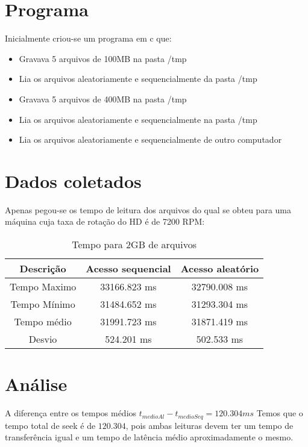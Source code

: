\documentclass[12pt,a4paper]{article}
\begin{document}
\section{Programa}
Inicialmente criou-se um programa em c que:
\begin{itemize}
\item Gravava 5 arquivos de 100MB na pasta /tmp
\item Lia os arquivos aleatoriamente e sequencialmente da pasta /tmp

\item Gravava 5 arquivos de 400MB na pasta /tmp
\item Lia os arquivos aleatoriamente e sequencialmente na pasta /tmp

\item Lia os arquivos aleatoriamente e sequencialmente de outro computador 

\end{itemize}
\section{Dados coletados}
Apenas pegou-se os tempo de leitura dos arquivos do qual se obteu para
uma máquina cuja taxa de rotação do HD é de 7200 RPM:

\begin{table}[h!]
\caption{Tempo para 2GB de arquivos}
\begin{center}
\begin{tabular}{ccc}
\hline 
\hline
Descrição & Acesso sequencial & Acesso aleatório \\
\hline
Tempo Maximo & 33166.823 ms & 32790.008 ms \\
Tempo Mínimo & 31484.652 ms & 31293.304 ms\\
Tempo médio & 31991.723 ms & 31871.419 ms\\
Desvio  & 524.201 ms & 502.533 ms \\

\end{tabular}
\end{center}
\end{table}


\section{Análise}

A diferença entre os tempos médios $t_{medioAl}-t_{medioSeq}=120.304 ms$
Temos que o tempo total de seek é de $120.304$, pois ambas leituras devem ter um tempo
de transferência igual e um tempo de latência médio aproximadamente o mesmo.
\end{document}
